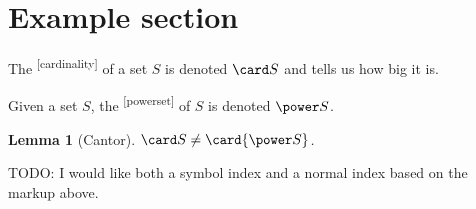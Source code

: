 \documentclass{omdoc}
\newtheorem{lemma}{Lemma}
\newcommand\indexdef[1]{\textsuperscript{[#1]}}
\begin{document}
\section{Example section}


\begin{definition}[title=\capitalize\cardinality]
  The \emph{\cardinality}\indexdef{cardinality} of a set $S$ is denoted $\card S$ and tells us how big it is.
\end{definition}

\begin{definition}[title=\capitalize\powerset]
  Given a set $S$, the \emph{\powerset}\indexdef{powerset} of $S$ is denoted $\power S$.
\end{definition}

\begin{lemma}[Cantor]
  $\card S\neq\card{\power S}$.
\end{lemma}

TODO: I would like both a symbol index and a normal index based on the markup above.
\end{document}
